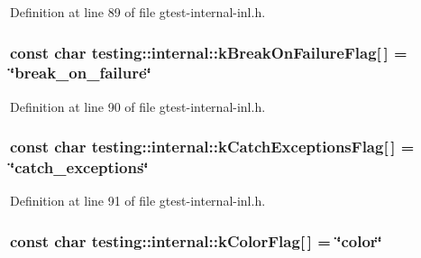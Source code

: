 Definition at line 89 of file gtest-\/internal-\/inl.\+h.

\subsubsection[{\texorpdfstring{k\+Break\+On\+Failure\+Flag}{kBreakOnFailureFlag}}]{\setlength{\rightskip}{0pt plus 5cm}const char testing\+::internal\+::k\+Break\+On\+Failure\+Flag\mbox{[}$\,$\mbox{]} = \char`\"{}break\+\_\+on\+\_\+failure\char`\"{}}\hypertarget{namespacetesting_1_1internal_a804c907155bfee3a6616ae3ca04048d0}{}\label{namespacetesting_1_1internal_a804c907155bfee3a6616ae3ca04048d0}


Definition at line 90 of file gtest-\/internal-\/inl.\+h.

\subsubsection[{\texorpdfstring{k\+Catch\+Exceptions\+Flag}{kCatchExceptionsFlag}}]{\setlength{\rightskip}{0pt plus 5cm}const char testing\+::internal\+::k\+Catch\+Exceptions\+Flag\mbox{[}$\,$\mbox{]} = \char`\"{}catch\+\_\+exceptions\char`\"{}}\hypertarget{namespacetesting_1_1internal_af4bb309802e83df0927097e6e4201a38}{}\label{namespacetesting_1_1internal_af4bb309802e83df0927097e6e4201a38}


Definition at line 91 of file gtest-\/internal-\/inl.\+h.

\subsubsection[{\texorpdfstring{k\+Color\+Flag}{kColorFlag}}]{\setlength{\rightskip}{0pt plus 5cm}const char testing\+::internal\+::k\+Color\+Flag\mbox{[}$\,$\mbox{]} = \char`\"{}color\char`\"{}}\hypertarget{namespacetesting_1_1internal_a884ff13b75232fbe7daa0caf46f1de66}{}\label{namespacetesting_1_1internal_a884ff13b75232fbe7daa0caf46f1de66}



